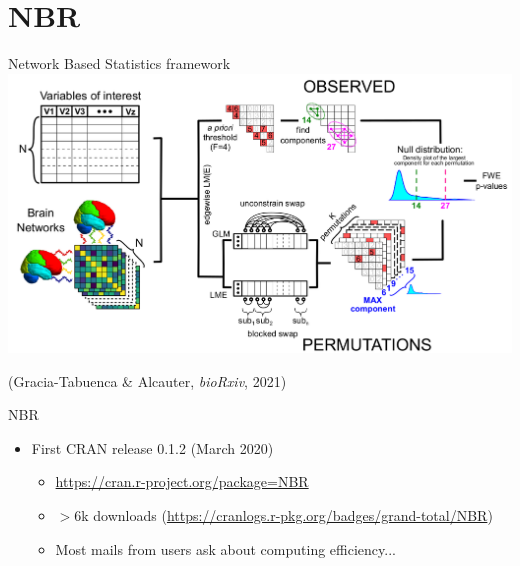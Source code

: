 \documentclass[english,aspectratio=169]{beamer}
\begin{document}
\section{NBR}

\begin{frame}{Network Based Statistics framework}%
  \centering
  \includegraphics[width=\textwidth]{NBR.png}\\[0.1cm]
  
  \raggedright
  (Gracia-Tabuenca \& Alcauter, \textit{bioRxiv}, 2021)

\end{frame}

\begin{frame}{NBR}%
  
  \large
  \begin{itemize}
    \item First CRAN release 0.1.2 (March 2020)
    \begin{itemize}
        \item \url{https://cran.r-project.org/package=NBR}
        \item $>$6k downloads (\url{https://cranlogs.r-pkg.org/badges/grand-total/NBR})
        \item Most mails from users ask about computing efficiency...
    \end{itemize}
  \end{itemize}

\end{frame}
\end{document}
